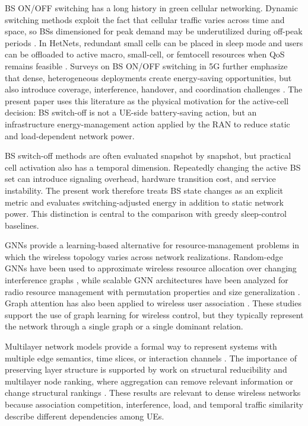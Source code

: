 \documentclass[journal]{IEEEtran}
\begin{document}
BS ON/OFF switching has a long history in green cellular networking. Dynamic
switching methods exploit the fact that cellular traffic varies across time and
space, so BSs dimensioned for peak demand may be underutilized during off-peak
periods \cite{oh2013dynamic}. In HetNets, redundant small cells can be placed in
sleep mode and users can be offloaded to active macro, small-cell, or femtocell
resources when QoS remains feasible \cite{ghazzai2017green}. Surveys on BS
ON/OFF switching in 5G further emphasize that dense, heterogeneous deployments
create energy-saving opportunities, but also introduce coverage, interference,
handover, and coordination challenges \cite{feng2017onoff}. The present paper
uses this literature as the physical motivation for the active-cell decision:
BS switch-off is not a UE-side battery-saving action, but an infrastructure
energy-management action applied by the RAN to reduce static and
load-dependent network power.

BS switch-off methods are often evaluated snapshot by snapshot, but practical
cell activation also has a temporal dimension. Repeatedly changing the active
BS set can introduce signaling overhead, hardware transition cost, and service
instability. The present work therefore treats BS state changes as an explicit
metric and evaluates switching-adjusted energy in addition to static network
power. This distinction is central to the comparison with greedy sleep-control
baselines.

GNNs provide a learning-based alternative for resource-management problems in
which the wireless topology varies across network realizations. Random-edge
GNNs have been used to approximate wireless resource allocation over changing
interference graphs \cite{eisen2020optimal}, while scalable GNN architectures
have been analyzed for radio resource management with permutation properties
and size generalization \cite{shen2021scalable}. Graph attention has also been
applied to wireless user association \cite{mirzaei2025gatua}. These studies
support the use of graph learning for wireless control, but they typically
represent the network through a single graph or a single dominant relation.

Multilayer network models provide a formal way to represent systems with
multiple edge semantics, time slices, or interaction channels
\cite{kivela2014multilayer,dedomenico2013mathematical,boccaletti2014structure}.
The importance of preserving layer structure is supported by work on structural
reducibility and multilayer node ranking, where aggregation can remove relevant
information or change structural rankings
\cite{dedomenico2015reducibility,dedomenico2015versatile}. These results are
relevant to dense wireless networks because association competition,
interference, load, and temporal traffic similarity describe different
dependencies among UEs.
\end{document}
